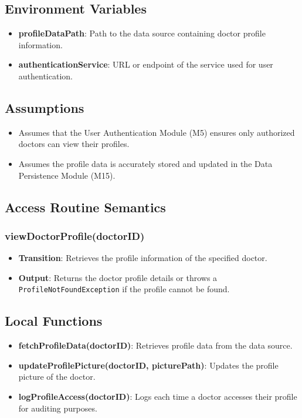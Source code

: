 \documentclass[12pt, titlepage]{article}
\begin{document}
\subsection{Environment Variables}
\begin{itemize}
\item \textbf{profileDataPath}: Path to the data source containing doctor profile information.
\item \textbf{authenticationService}: URL or endpoint of the service used for user authentication.
\end{itemize}

\subsection{Assumptions}
\begin{itemize}
\item Assumes that the User Authentication Module (M5) ensures only authorized doctors can view their profiles.
\item Assumes the profile data is accurately stored and updated in the Data Persistence Module (M15).
\end{itemize}

\subsection{Access Routine Semantics}
\subsubsection{viewDoctorProfile(doctorID)}
\begin{itemize}
    \item \textbf{Transition}: Retrieves the profile information of the specified doctor.
    \item \textbf{Output}: Returns the doctor profile details or throws a \texttt{ProfileNotFoundException} if the profile cannot be found.
\end{itemize}


\subsection{Local Functions}
\begin{itemize}
\item \textbf{fetchProfileData(doctorID)}: Retrieves profile data from the data source.
\item \textbf{updateProfilePicture(doctorID, picturePath)}: Updates the profile picture of the doctor.
\item \textbf{logProfileAccess(doctorID)}: Logs each time a doctor accesses their profile for auditing purposes.
\end{itemize}
\end{document}
